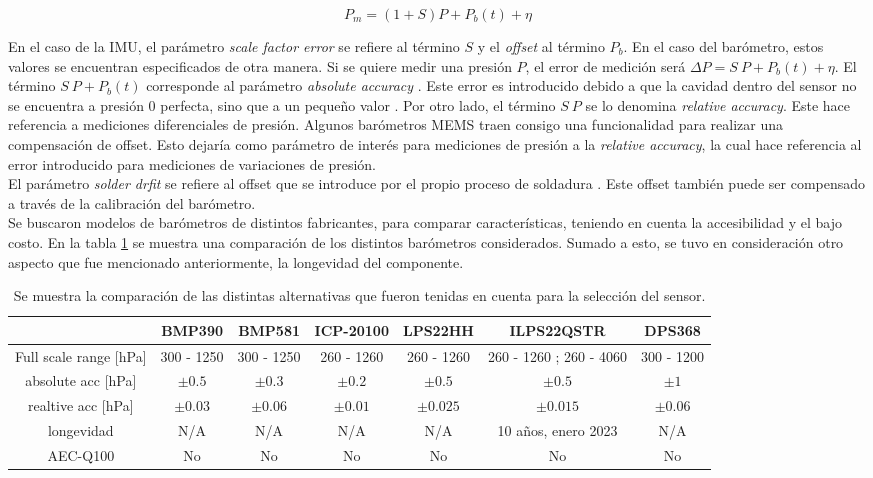 \begin{equation}
    P_m = (1+S)P + P_b(t) + \eta
    \label{eq:medicion_presion}
\end{equation}

En el caso de la IMU, el parámetro \textit{scale factor error} se refiere al término $S$ y el \textit{offset} al término $P_b$. En el caso del barómetro, estos valores se encuentran especificados de otra manera. Si se quiere medir una presión $P$, el error de medición será $\Delta P = S \ P + P_b(t) + \eta$. El término $S \ P + P_b(t)$ corresponde al parámetro \textit{absolute accuracy} \cite{baro_4}. Este error es introducido debido a que la cavidad dentro del sensor no se encuentra a presión 0 perfecta, sino que a un pequeño valor \cite{baro_1}. Por otro lado, el término $S \ P$ se lo denomina \textit{relative accuracy}. Este hace referencia a mediciones diferenciales de presión. Algunos barómetros MEMS traen consigo una funcionalidad para realizar una compensación de offset. Esto dejaría como parámetro de interés para mediciones de presión a la \textit{relative accuracy}, la cual hace referencia al error introducido para mediciones de variaciones de presión.\\

El parámetro \textit{solder drfit} se refiere al offset que se introduce por el propio proceso de soldadura \cite{baro_4}. Este offset también puede ser compensado a través de la calibración del barómetro.\\

Se buscaron modelos de barómetros de distintos fabricantes, para comparar características, teniendo en cuenta la accesibilidad y el bajo costo. En la tabla \ref{tab:comparacion_baros} se muestra una comparación de los distintos barómetros considerados. Sumado a esto, se tuvo en consideración otro aspecto que fue mencionado anteriormente, la longevidad del componente.

\begin{table}[H]
    \centering
    \begin{tabular}{|c||c|c|c|c|c|c|}
        \hline
          & BMP390 & BMP581 & ICP-20100 & LPS22HH & ILPS22QSTR & DPS368\\
        \hline
        Full scale range [hPa] & 300 - 1250 & 300 - 1250 & 260 - 1260 & 260 - 1260 & 260 - 1260 ; 260 - 4060 & 300 - 1200\\ 
        absolute acc [hPa] & $\pm 0.5$ & $\pm 0.3$ & $\pm 0.2$ & $\pm 0.5$ & $\pm 0.5$ & $\pm 1$\\
        realtive acc [hPa] & $\pm 0.03$ & $\pm 0.06$ & $\pm 0.01$ & $\pm 0.025$ & $\pm 0.015$ & $\pm 0.06$\\
        \hline
        longevidad & N/A & N/A & N/A & N/A & 10 años, enero 2023 & N/A \\
        AEC-Q100 & No & No & No & No & No & No\\
        \hline       
    \end{tabular}
    \caption{Se muestra la comparación de las distintas alternativas que fueron tenidas en cuenta para la selección del sensor.}
    \label{tab:comparacion_baros}
\end{table}

